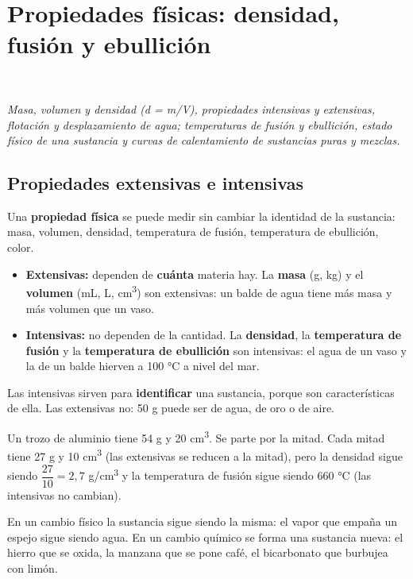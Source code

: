 \section[Propiedades físicas: densidad, fusión y ebullición]{Propiedades físicas: densidad, fusión y ebullición}
\modcomun\ \ {\color{gris}\itshape Masa, volumen y densidad (d = m/V), propiedades intensivas y extensivas, flotación y desplazamiento de agua; temperaturas de fusión y ebullición, estado físico de una sustancia y curvas de calentamiento de sustancias puras y mezclas.\par}
\subsection{Propiedades extensivas e intensivas}
Una \textbf{propiedad física} se puede medir sin cambiar la identidad de la sustancia: masa, volumen, densidad, temperatura de fusión, temperatura de ebullición, color.

 
\begin{itemize}
  \item \textbf{Extensivas:} dependen de \textbf{cuánta} materia hay. La \textbf{masa} (g, kg) y el \textbf{volumen} (mL, L, cm\textsuperscript{3}) son extensivas: un balde de agua tiene más masa y más volumen que un vaso.
  \item \textbf{Intensivas:} no dependen de la cantidad. La \textbf{densidad}, la \textbf{temperatura de fusión} y la \textbf{temperatura de ebullición} son intensivas: el agua de un vaso y la de un balde hierven a 100 °C a nivel del mar.
\end{itemize}
 

Las intensivas sirven para \textbf{identificar} una sustancia, porque son características de ella. Las extensivas no: 50 g puede ser de agua, de oro o de aire.

  
\begin{ejemplo} Un trozo de aluminio tiene 54 g y 20 cm\textsuperscript{3}. Se parte por la mitad. Cada mitad tiene 27 g y 10 cm\textsuperscript{3} (las extensivas se reducen a la mitad), pero la densidad sigue siendo $\dfrac{27}{10} = 2{,}7$ g/cm\textsuperscript{3} y la temperatura de fusión sigue siendo 660 °C (las intensivas no cambian).\end{ejemplo}
 
\begin{ojo} En un cambio físico la sustancia sigue siendo la misma: el vapor que empaña un espejo sigue siendo agua. En un cambio químico se forma una sustancia nueva: el hierro que se oxida, la manzana que se pone café, el bicarbonato que burbujea con limón.\end{ojo}
